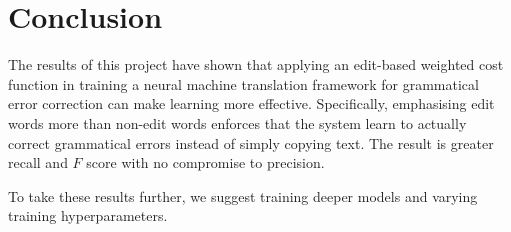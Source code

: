 \chapter{Conclusion} \label{ch:conclusion}
The results of this project have shown that applying an edit-based weighted cost function in training a neural machine translation framework for grammatical error correction can make learning more effective. Specifically, emphasising edit words more than non-edit words enforces that the system learn to actually correct grammatical errors instead of simply copying text. The result is greater recall and $F$ score with no compromise to precision.

To take these results further, we suggest training deeper models and varying training hyperparameters.